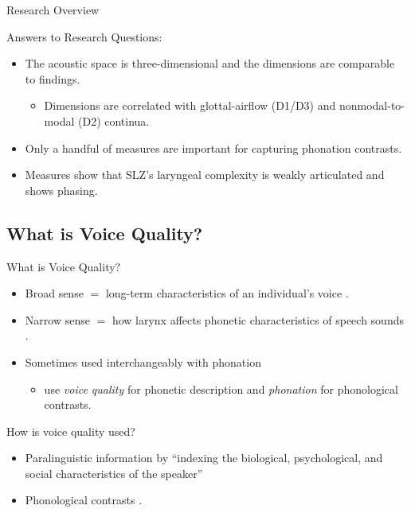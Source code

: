 \documentclass[professionalfont]{beamer}
\begin{document}
\begin{frame}{Research Overview}
  \begin{block}{Answers to Research Questions:}
    \begin{itemize}
      \item The acoustic space is three-dimensional and the dimensions are comparable to  findings.
      \begin{itemize}
        \item Dimensions are correlated with glottal-airflow (D1/D3) and nonmodal-to-modal (D2) continua.
      \end{itemize}
      \item Only a handful of measures are important for capturing phonation contrasts.
      \item Measures show that SLZ's laryngeal complexity is weakly articulated and shows phasing. 
    \end{itemize}  
  \end{block}
\end{frame}

\subsection{What is Voice Quality?}

\begin{frame}{What is Voice Quality?}
  \begin{itemize}
  \item Broad sense $=$ long-term characteristics of an individual's voice \citep{abercrombieElementsGeneralPhonetics1967,laverPhoneticDescriptionVoice1980}.
  \item Narrow sense $=$ how larynx affects phonetic characteristics of speech sounds \citep[e.g.,][]{eslingVoiceQualityLaryngeal2019}.
  \item Sometimes used interchangeably with phonation
    \begin{itemize}
      \item \cite{barzilaiContextdependentPhoneticEnhancement2021} use \textit{voice quality} for phonetic description and \textit{phonation} for phonological contrasts.
    \end{itemize}
  \end{itemize}
\end{frame}

\begin{frame}{How is voice quality used?}
  \begin{itemize}
    \item Paralinguistic information by ``indexing the biological, psychological, and social characteristics of the speaker'' \citep[e.g.,][]{laverVoiceQualityIndexical1968,podesvaStanceWindowLanguageRace2016}
    \item Phonological contrasts \citep[e.g.,][]{espositoCrosslinguisticPatternsPhonation2020}.
  \end{itemize}
\end{frame}
\end{document}
